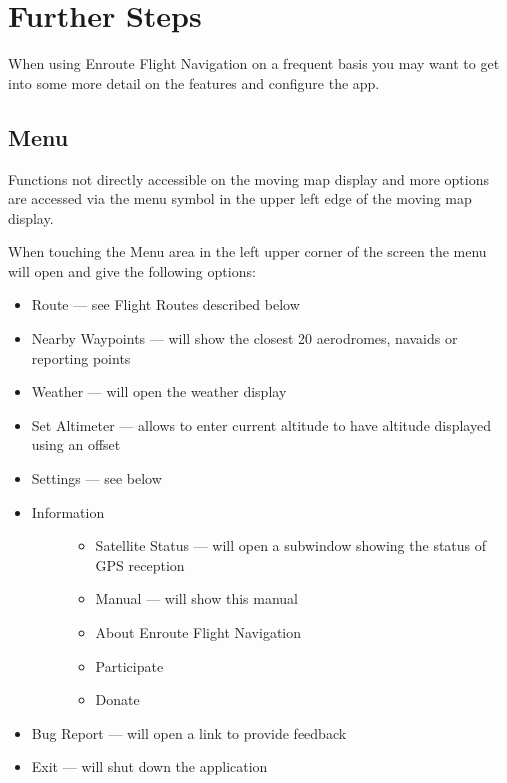 \documentclass[letterpaper,10pt,english]{sphinxmanual}
\begin{document}
\chapter{Further Steps}
\label{\detokenize{01-intro/further_steps:further-steps}}\label{\detokenize{01-intro/further_steps::doc}}
When using Enroute Flight Navigation on a frequent basis you may want to get into some more detail on the features and configure the app.


\section{Menu}
\label{\detokenize{01-intro/further_steps:menu}}
Functions not directly accessible on the moving map display and more options are accessed via the menu symbol in the upper left edge of the moving map display.

When touching the Menu area in the left upper corner of the screen the menu will open and give the following options:
\begin{itemize}
\item {} 
Route — see Flight Routes described below

\item {} 
Nearby Waypoints  — will show the closest 20 aerodromes, navaids or reporting points

\item {} 
Weather   — will open the weather display

\item {} 
Set Altimeter — allows to enter current altitude to have altitude displayed using an offset

\item {} 
Settings — see below

\item {} \begin{description}
\item[{Information}] \leavevmode\begin{itemize}
\item {} 
Satellite Status  — will open a sub\sphinxhyphen{}window showing the status of GPS reception

\item {} 
Manual — will show this manual

\item {} 
About Enroute Flight Navigation

\item {} 
Participate

\item {} 
Donate

\end{itemize}

\end{description}

\item {} 
Bug Report — will open a link to provide feedback

\item {} 
Exit — will shut down the application

\end{itemize}
\end{document}
